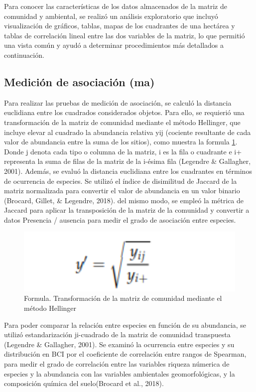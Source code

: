 \documentclass[11pt,]{article}
\begin{document}
Para conocer las características de los datos almacenados de la matriz
de comunidad y ambiental, se realizó un análisis exploratorio que
incluyó visualización de gráficos, tablas, mapas de los cuadrantes de
una hectárea y tablas de correlación lineal entre las dos variables de
la matriz, lo que permitió una vista común y ayudó a determinar
procedimientos más detallados a continuación.

\subsection{Medición de asociación
(ma)}\label{mediciuxf3n-de-asociaciuxf3n-ma}

Para realizar las pruebas de medición de asociación, se calculó la
distancia euclidiana entre los cuadrados considerados objetos. Para
ello, se requierió una transformación de la matriz de comunidad mediante
el método Hellinger, que incluye elevar al cuadrado la abundancia
relativa yij (cociente resultante de cada valor de abundancia entre la
suma de los sitios), como muestra la formula \ref{fig:formula}. Donde j
denota cada tipo o columna de la matriz, i es la fila o cuadrante e i+
representa la suma de filas de la matriz de la i-ésima fila (Legendre \&
Gallagher, 2001). Además, se evaluó la distancia euclidiana entre los
cuadrantes en términos de ocurrencia de especies. Se utilizó el índice
de disimilitud de Jaccard de la matriz normalizada para convertir el
valor de abundancia en un valor binario (Brocard, Gillet, \& Legendre,
2018). del mismo modo, se empleó la métrica de Jaccard para aplicar la
transposición de la matriz de la comunidad y convertir a datos Presencia
/ ausencia para medir el grado de asociación entre especies.

\begin{figure}
\centering
\includegraphics[width=1.00000\textwidth]{Formula2.png}
\caption{Formula. Transformación de la matriz de comunidad mediante el
método Hellinger \label{fig:formula}}
\end{figure}

Para poder comparar la relación entre especies en función de su
abundancia, se utilizó estandarización ji-cuadrado de la matriz de
comunidad transpuesta (Legendre \& Gallagher, 2001). Se examinó la
ocurrencia entre especies y su distribución en BCI por el coeficiente de
correlación entre rangos de Spearman, para medir el grado de correlación
entre las variables riqueza númerica de especies y la abundancia con las
variables ambientales geomorfológicas, y la composición química del
suelo(Brocard et al., 2018).
\end{document}
